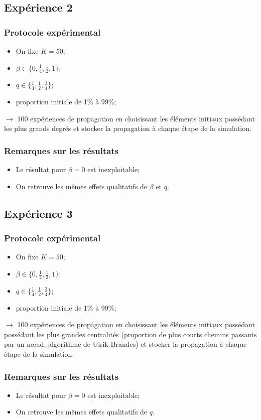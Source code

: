 \documentclass{beamer}
\begin{document}
\subsection{Expérience 2}
\begin{frame}
  \frametitle{Protocole expérimental}
  \begin{itemize}
    \item On fixe $K=50$;
    \item $\beta \in \{0,\frac{1}{4},\frac{1}{2},1\}$;
    \item $q\in \{\frac{1}{4}, \frac{1}{2}, \frac{3}{4}\}$;
    \item proportion initiale de 1\% à 99\%;
  \end{itemize}
  $\rightarrow$ 100 expériences de propagation en choisissant les éléments initiaux possédant les plus grands degrés et stocker la propagation à chaque étape de la simulation.
\end{frame}
\begin{frame}
  \frametitle{Remarques sur les résultats}
  \begin{itemize}
    \item Le résultat pour $\beta=0$ est inexploitable;
    \item On retrouve les mêmes effets qualitatifs de $\beta$ et $q$.
  \end{itemize}
\end{frame}

\subsection{Expérience 3}
\begin{frame}
  \frametitle{Protocole expérimental}
  \begin{itemize}
    \item On fixe $K=50$;
    \item $\beta \in \{0,\frac{1}{4},\frac{1}{2},1\}$;
    \item $q\in \{\frac{1}{4}, \frac{1}{2}, \frac{3}{4}\}$;
    \item proportion initiale de 1\% à 99\%;
  \end{itemize}
  $\rightarrow$ 100 expériences de propagation en choisissant les éléments initiaux possédant possédant les plus grandes centralités (proportion de plus courts chemins passants par un nœud, algorithme de Ulrik Brandes) et stocker la propagation à chaque étape de la simulation.
\end{frame}
\begin{frame}
  \frametitle{Remarques sur les résultats}
  \begin{itemize}
    \item Le résultat pour $\beta=0$ est inexploitable;
    \item On retrouve les mêmes effets qualitatifs de $q$.
  \end{itemize}
\end{frame}
\end{document}
